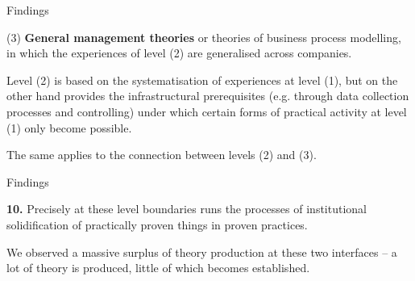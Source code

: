 \documentclass{beamer}
\begin{document}
\begin{frame}{Findings}

(3) \textbf{General management theories} or theories of business process
modelling, in which the experiences of level (2) are generalised across
companies.

Level (2) is based on the systematisation of experiences at level (1), but on
the other hand provides the infrastructural prerequisites (e.g. through data
collection processes and controlling) under which certain forms of practical
activity at level (1) only become possible.

The same applies to the connection between levels (2) and (3).

\end{frame}
\begin{frame}{Findings}

\textbf{10.}  
Precisely at these level boundaries runs the processes of institutional
solidification of practically proven things in proven practices.

We observed a massive surplus of theory production at these two interfaces --
a lot of theory is produced, little of which becomes established.

\end{frame}
\end{document}
